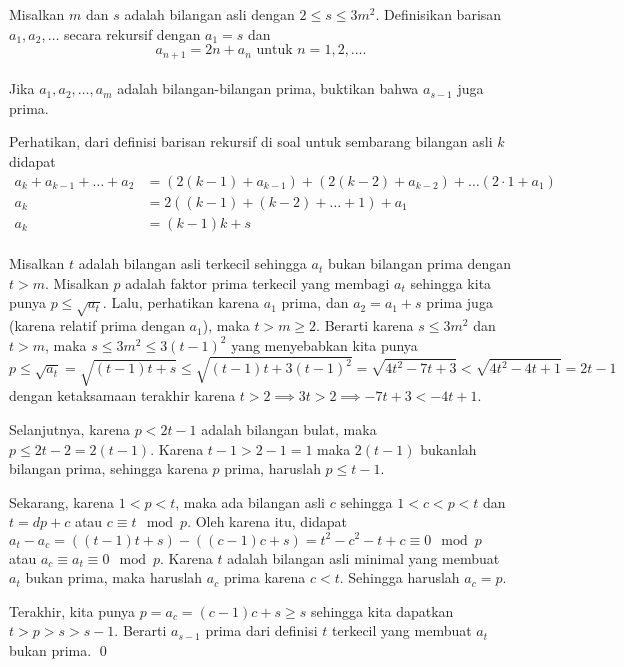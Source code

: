 \documentclass[11pt]{scrartcl}
\begin{document}
	\begin{soalbaru}
		Misalkan $m$ dan $s$ adalah bilangan asli dengan $2 \le s \le 3m^2.$ Definisikan barisan $a_1,a_2,\dots$ secara rekursif dengan $a_1=s$ dan \\[-18pt]$$a_{n+1} = 2n + a_n \text{    untuk   }  n=1,2,\dots.$$\\[-23pt]
		Jika $a_1,a_2,\dots,a_m$ adalah bilangan-bilangan prima, buktikan bahwa $a_{s-1}$ juga prima.\\[-10pt]
		\begin{solusi}
			Perhatikan, dari definisi barisan rekursif di soal untuk sembarang bilangan asli $k$ didapat\\[-23pt]
			\begin{align*}
				a_{k}+a_{k-1}+\dots+a_2 &= (2(k-1)+a_{k-1})+(2(k-2)+a_{k-2})+\dots (2\cdot 1+a_1)\\
				a_k &= 2((k-1)+(k-2)+\dots+1)+a_1\\
				a_k &= (k-1)k + s
			\end{align*}\\[-25pt] 
			Misalkan $t$ adalah bilangan asli terkecil sehingga $a_t$ bukan bilangan prima dengan $t > m$. Misalkan $p$ adalah faktor prima terkecil yang membagi $a_t$ sehingga kita punya $p \le \sqrt{a_t}$. Lalu, perhatikan karena $a_1 $ prima, dan $a_2 = a_1 +s$ prima juga (karena relatif prima dengan $a_1$), maka $t>m \ge 2$. Berarti karena $s \le 3m^2$ dan $t > m$, maka $ s \le 3m^2 \le 3(t-1)^2$ yang menyebabkan kita punya 
			$$p \le \sqrt{a_t} = \sqrt{(t-1)t+s}\le \sqrt{(t-1)t+3(t-1)^2} = \sqrt{4t^2-7t+3} < \sqrt{4t^2-4t+1} = 2t-1$$dengan ketaksamaan terakhir karena $t > 2 \implies 3t > 2 \implies -7t+3 < -4t+1$.
			
			Selanjutnya, karena $p<2t-1$ adalah bilangan bulat, maka $p \le 2t-2 = 2(t-1)$. Karena $t-1 > 2-1 = 1$ maka $2(t-1)$ bukanlah bilangan prima, sehingga karena $p$ prima, haruslah $p \le t-1$. 
			
			Sekarang, karena $1 < p < t$, maka ada bilangan asli $c$ sehingga $1 < c < p<t$ dan $t=dp+c$ atau $c \equiv t \mod p$. Oleh karena itu, didapat $a_t - a_c = ((t-1)t+s)-((c-1)c+s) = t^2 - c^2 - t+c \equiv 0 \mod p$ atau $a_c \equiv a_t \equiv 0 \mod p$. Karena $t$ adalah bilangan asli minimal yang membuat $a_t$ bukan prima, maka haruslah $a_c$ prima karena $c<t$. Sehingga haruslah $a_c = p$.
			
			Terakhir, kita punya $p=a_c=(c-1)c+s \ge s$ sehingga kita dapatkan $t > p > s > s-1$. Berarti $a_{s-1}$ prima dari definisi $t$ terkecil yang membuat $a_t$ bukan prima. \qed
		\end{solusi}
		
	\end{soalbaru}
\end{document}
